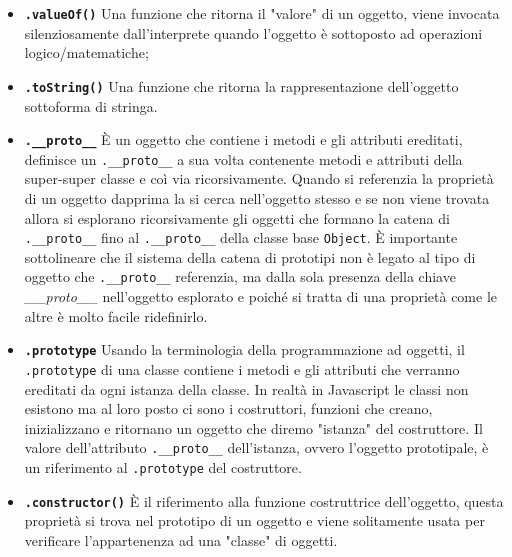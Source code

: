 \documentclass{sapthesis}
\newcommand{\bold}[1]{\textbf{#1}}
\newcommand{\code}[1]{\texttt{#1}}
\newcommand{\method}[1]{\code{.#1()}}
\newcommand{\attr}[1]{\code{.#1}}
\newcommand{\JS}{Javascript}
\begin{document}
        \begin{itemize}
            \item \bold{\method{valueOf}} Una funzione che ritorna il "valore" di un oggetto, viene invocata
                    silenziosamente dall'interprete quando l'oggetto è sottoposto ad operazioni logico/matematiche;

            \item \bold{\method{toString}} Una funzione che ritorna la rappresentazione dell'oggetto
                    sottoforma di stringa.

            \item \bold{\attr{\_\_proto\_\_}} È un oggetto che contiene i metodi e gli attributi ereditati, 
                    definisce un \attr{\_\_proto\_\_} a sua volta contenente metodi e attributi della super-super classe 
                    e coì via ricorsivamente. Quando si referenzia la proprietà di un oggetto dapprima la si cerca
                    nell'oggetto stesso e se non viene trovata allora si esplorano ricorsivamente gli oggetti che
                    formano la catena di \attr{\_\_proto\_\_} fino al \attr{\_\_proto\_\_} della classe
                    base \code{Object}. È importante sottolineare che il sistema della catena di prototipi non è
                    legato al tipo di oggetto che \attr{\_\_proto\_\_} referenzia, ma dalla sola presenza della chiave 
                    \textit{\_\_proto\_\_} nell'oggetto esplorato e poiché si tratta di una proprietà come le altre
                     è molto facile ridefinirlo.

            \item \bold{\attr{prototype}} Usando la terminologia della programmazione ad oggetti, il \attr{prototype}
                    di una classe contiene i metodi e gli attributi che verranno ereditati da ogni istanza della classe.
                    In realtà in \JS{} le classi non esistono ma al loro posto ci sono i costruttori, funzioni che creano,
                    inizializzano e ritornano un oggetto che diremo "istanza" del costruttore. Il valore dell'attributo \attr{\_\_proto\_\_}
                    dell'istanza, ovvero l'oggetto prototipale, è un riferimento al \attr{prototype} del costruttore.
            
            \item \bold{\method{constructor}} È il riferimento alla funzione costruttrice dell'oggetto, questa proprietà
                    si trova nel prototipo di un oggetto e viene solitamente usata per verificare l'appartenenza ad una
                    "classe" di oggetti.
        \end{itemize}
\end{document}
